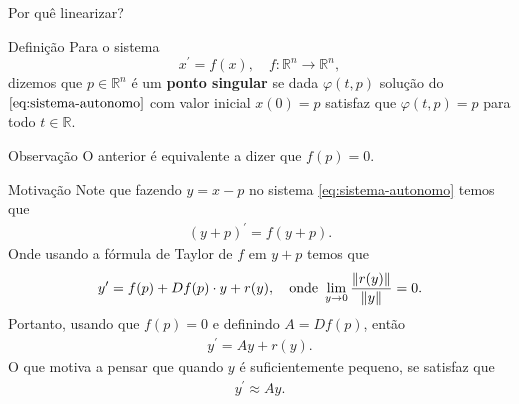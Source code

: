 \begin{frame}{Por quê linearizar?}
  \begin{block}{Definição}
    Para o sistema
    \begin{equation}\label{eq:sistema-autonomo}
      x^{\prime}=f(x),\quad f:\mathbb{R}^{n}\to\mathbb{R}^{n},
    \end{equation}
    dizemos que $p\in\mathbb{R}^{n}$ é um \textbf{ponto singular} se dada $\varphi(t,p)$ solução do $\eqref{eq:sistema-autonomo}$ com valor inicial $x(0)=p$ satisfaz que $\varphi(t,p)=p$ para todo $t\in\mathbb{R}$. 
  \end{block}
  \begin{block}{Observação}
    O anterior é equivalente a dizer que $f(p)=0$.      
  \end{block}
\end{frame}

\begin{frame}{Motivação}
  Note que fazendo $y=x-p$ no sistema \eqref{eq:sistema-autonomo} temos que
  \begin{align*}
    (y+p)^{\prime}=f(y+p).
  \end{align*}
  \pause
  Onde usando a fórmula de Taylor de $f$ em $y+p$ temos que
  \begin{align*}
    y^{\prime}=f(p)+Df(p)\cdot y+r(y),\quad\text{onde }\lim_{y \to 0}\frac{\left\|r(y)\right\|}{\left\|y\right\|}=0.
  \end{align*}
  \pause
  Portanto, usando que $f(p)=0$ e definindo $A=Df(p)$, então
  \begin{align*}
    y^{\prime}=Ay+r(y).
  \end{align*}
  \pause
  O que motiva a pensar que quando $y$ é suficientemente pequeno, se satisfaz que
  \begin{align*}
    y^{\prime}\approx Ay.
  \end{align*}
\end{frame}
